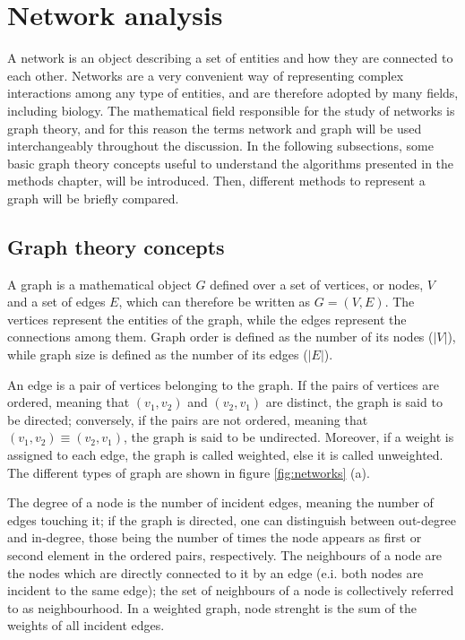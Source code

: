 \section{Network analysis}

A network is an object describing a set of entities and how they are connected to each other. Networks are a very convenient way of representing complex interactions among any type of entities, and are therefore adopted by many fields, including biology. The mathematical field responsible for the study of networks is graph theory, and for this reason the terms network and graph will be used interchangeably throughout the discussion. In the following subsections, some basic graph theory concepts useful to understand the algorithms presented in the methods chapter, will be introduced. Then, different methods to represent a graph will be briefly compared.

\subsection{Graph theory concepts}
A graph is a mathematical object $G$ defined over a set of vertices, or nodes, $V$ and a set of edges $E$, which can therefore be written as $G=(V,E)$. The vertices represent the entities of the graph, while the edges represent the connections among them. Graph order is defined as the number of its nodes ($|V|$), while graph size is defined as the number of its edges ($|E|$).

An edge is a pair of vertices belonging to the graph. If the pairs of vertices are ordered, meaning that $(v_1,v_2)$ and $(v_2, v_1)$ are distinct, the graph is said to be directed; conversely, if the pairs are not ordered, meaning that $(v_1,v_2) \equiv (v_2, v_1)$, the graph is said to be undirected. Moreover, if a weight is assigned to each edge, the graph is called weighted, else it is called unweighted. The different types of graph are shown in figure \ref{fig:networks} (a).

The degree of a node is the number of incident edges, meaning the number of edges touching it; if the graph is directed, one can distinguish between out-degree and in-degree, those being the number of times the node appears as first or second element in the ordered pairs, respectively. The neighbours of a node are the nodes which are directly connected to it by an edge (e.i. both nodes are incident to the same edge); the set of neighbours of a node is collectively referred to as neighbourhood. In a weighted graph, node strenght is the sum of the weights of all incident edges. 

